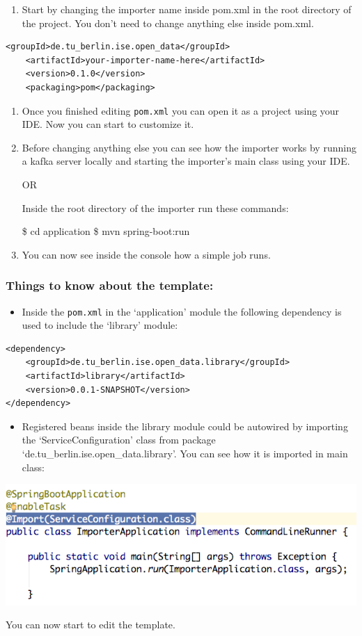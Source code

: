 \begin{enumerate}
\def\labelenumi{\arabic{enumi}.}
\setcounter{enumi}{1}
\tightlist
\item
  Start by changing the importer name inside pom.xml in the root
  directory of the project. You don't need to change anything else
  inside pom.xml.
\end{enumerate}

\begin{verbatim}
<groupId>de.tu_berlin.ise.open_data</groupId>
    <artifactId>your-importer-name-here</artifactId>
    <version>0.1.0</version>
    <packaging>pom</packaging>
\end{verbatim}

\begin{enumerate}
\def\labelenumi{\arabic{enumi}.}
\setcounter{enumi}{2}
\item
  Once you finished editing \texttt{pom.xml} you can open it as a
  project using your IDE. Now you can start to customize it.
\item
  Before changing anything else you can see how the importer works by
  running a kafka server locally and starting the importer's main class
  using your IDE.

  OR

  Inside the root directory of the importer run these commands:

  \$ cd application \$ mvn spring-boot:run
\item
  You can now see inside the console how a simple job runs.
\end{enumerate}

\subsubsection{Things to know about the
template:}\label{things-to-know-about-the-template}

\begin{itemize}
\tightlist
\item
  Inside the \texttt{pom.xml} in the `application' module the following
  dependency is used to include the `library' module:
\end{itemize}

\begin{verbatim}
<dependency>
    <groupId>de.tu_berlin.ise.open_data.library</groupId>
    <artifactId>library</artifactId>
    <version>0.0.1-SNAPSHOT</version>
</dependency>
\end{verbatim}

\begin{itemize}
\tightlist
\item
  Registered beans inside the library module could be autowired by
  importing the `ServiceConfiguration' class from package
  `de.tu\_berlin.ise.open\_data.library'. You can see how it is imported
  in main class:
\end{itemize}

\includegraphics[width=1.00\textwidth]{images/template.png}

You can now start to edit the template.